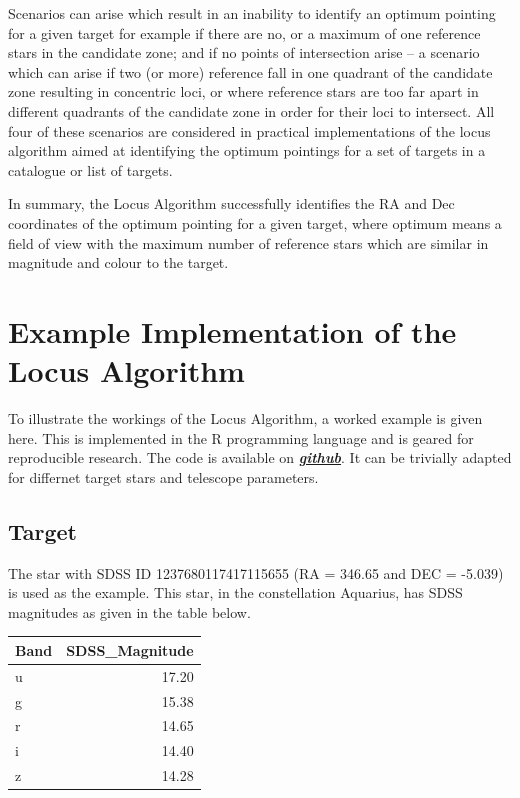 \documentclass[]{elsarticle} %
\begin{document}
\newpage

Scenarios can arise which result in an inability to identify an optimum
pointing for a given target for example if there are no, or a maximum of
one reference stars in the candidate zone; and if no points of
intersection arise -- a scenario which can arise if two (or more)
reference fall in one quadrant of the candidate zone resulting in
concentric loci, or where reference stars are too far apart in different
quadrants of the candidate zone in order for their loci to intersect.
All four of these scenarios are considered in practical implementations
of the locus algorithm aimed at identifying the optimum pointings for a
set of targets in a catalogue or list of targets.

In summary, the Locus Algorithm successfully identifies the RA and Dec
coordinates of the optimum pointing for a given target, where optimum
means a field of view with the maximum number of reference stars which
are similar in magnitude and colour to the target.

\newpage

\hypertarget{example-implementation-of-the-locus-algorithm}{%
\section{Example Implementation of the Locus
Algorithm}\label{example-implementation-of-the-locus-algorithm}}

To illustrate the workings of the Locus Algorithm, a worked example is
given here. This is implemented in the R programming language and is
geared for reproducible research. The code is available on
\emph{\textbf{\href{https://github.com/eugene100hickey/LocusAlgorithm}{github}}}.
It can be trivially adapted for differnet target stars and telescope
parameters.

\hypertarget{target}{%
\subsection{Target}\label{target}}

The star with SDSS ID 1237680117417115655 (RA = 346.65 and DEC = -5.039)
is used as the example. This star, in the constellation Aquarius, has
SDSS magnitudes as given in the table below.

\begin{longtable}[]{@{}lr@{}}
\toprule
Band & SDSS\_Magnitude\tabularnewline
\midrule
\endhead
u & 17.20\tabularnewline
g & 15.38\tabularnewline
r & 14.65\tabularnewline
i & 14.40\tabularnewline
z & 14.28\tabularnewline
\bottomrule
\end{longtable}
\end{document}

